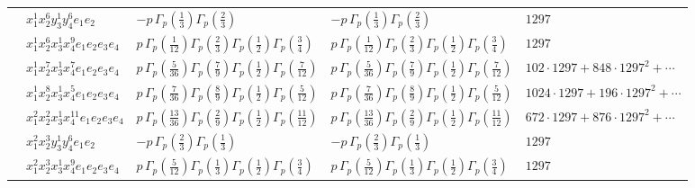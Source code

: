 \documentclass[11pt]{article}
\begin{document}
\begin{table}[ht]
{\begin{tabular}{@{}lllll@{}}
 & $x_{1}^{1} x_{2}^{6} y_{3}^{1} y_{4}^{6} e_{1} e_{2}$ & $- p \, \Gamma_p \left( \frac{1}{3} \right) \Gamma_p \left( \frac{2}{3} \right)$ & $- p \, \Gamma_p \left( \frac{1}{3} \right) \Gamma_p \left( \frac{2}{3} \right)$ & $1297$ \\
 & $x_{1}^{1} x_{2}^{6} x_{3}^{1} x_{4}^{9}  e_{1} e_{2} e_{3} e_{4}$ & $p \, \Gamma_p \left( \frac{1}{12} \right) \Gamma_p \left( \frac{2}{3} \right) \Gamma_p \left( \frac{1}{2} \right) \Gamma_p \left( \frac{3}{4} \right)$ & $p \, \Gamma_p \left( \frac{1}{12} \right) \Gamma_p \left( \frac{2}{3} \right) \Gamma_p \left( \frac{1}{2} \right) \Gamma_p \left( \frac{3}{4} \right)$ & $1297$ \\
 & $x_{1}^{1} x_{2}^{7} x_{3}^{1} x_{4}^{7}  e_{1} e_{2} e_{3} e_{4}$ & $p \, \Gamma_p \left( \frac{5}{36} \right) \Gamma_p \left( \frac{7}{9} \right) \Gamma_p \left( \frac{1}{2} \right) \Gamma_p \left( \frac{7}{12} \right)$ & $p \, \Gamma_p \left( \frac{5}{36} \right) \Gamma_p \left( \frac{7}{9} \right) \Gamma_p \left( \frac{1}{2} \right) \Gamma_p \left( \frac{7}{12} \right)$ & $102{\cdot}1297{+}848{\cdot}1297^{2}{+}\cdots$ \\
 & $x_{1}^{1} x_{2}^{8} x_{3}^{1} x_{4}^{5}  e_{1} e_{2} e_{3} e_{4}$ & $p \, \Gamma_p \left( \frac{7}{36} \right) \Gamma_p \left( \frac{8}{9} \right) \Gamma_p \left( \frac{1}{2} \right) \Gamma_p \left( \frac{5}{12} \right)$ & $p \, \Gamma_p \left( \frac{7}{36} \right) \Gamma_p \left( \frac{8}{9} \right) \Gamma_p \left( \frac{1}{2} \right) \Gamma_p \left( \frac{5}{12} \right)$ & $1024{\cdot}1297{+}196{\cdot}1297^{2}{+}\cdots$ \\
 & $x_{1}^{2} x_{2}^{2} x_{3}^{1} x_{4}^{11}  e_{1} e_{2} e_{3} e_{4}$ & $p \, \Gamma_p \left( \frac{13}{36} \right) \Gamma_p \left( \frac{2}{9} \right) \Gamma_p \left( \frac{1}{2} \right) \Gamma_p \left( \frac{11}{12} \right)$ & $p \, \Gamma_p \left( \frac{13}{36} \right) \Gamma_p \left( \frac{2}{9} \right) \Gamma_p \left( \frac{1}{2} \right) \Gamma_p \left( \frac{11}{12} \right)$ & $672{\cdot}1297{+}876{\cdot}1297^{2}{+}\cdots$ \\
 & $x_{1}^{2} x_{2}^{3} y_{3}^{1} y_{4}^{6} e_{1} e_{2}$ & $- p \, \Gamma_p \left( \frac{2}{3} \right) \Gamma_p \left( \frac{1}{3} \right)$ & $- p \, \Gamma_p \left( \frac{2}{3} \right) \Gamma_p \left( \frac{1}{3} \right)$ & $1297$ \\
 & $x_{1}^{2} x_{2}^{3} x_{3}^{1} x_{4}^{9}  e_{1} e_{2} e_{3} e_{4}$ & $p \, \Gamma_p \left( \frac{5}{12} \right) \Gamma_p \left( \frac{1}{3} \right) \Gamma_p \left( \frac{1}{2} \right) \Gamma_p \left( \frac{3}{4} \right)$ & $p \, \Gamma_p \left( \frac{5}{12} \right) \Gamma_p \left( \frac{1}{3} \right) \Gamma_p \left( \frac{1}{2} \right) \Gamma_p \left( \frac{3}{4} \right)$ & $1297$ \\

\end{tabular}}
\end{table}
\end{document}
